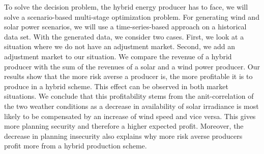 To solve the  decision problem, the hybrid energy producer has to face, we will solve a scenario-based multi-stage optimization problem. For generating wind and solar power scenarios, we will use a time-series-based approach on a historical data set. With the generated data, we consider two cases. First, we look at a situation where we do not have an adjustment market. Second, we add an adjustment market to our situation. We compare the revenue of a hybrid producer with the sum of the revenues of a solar and a wind power producer. Our results show that the more risk averse a producer is, the more profitable it is to produce in a hybrid scheme. This effect can be observed in both market situations. We conclude that this profitability stems from the anit-correlation of the two weather conditions as a decrease in availability of solar irradiance is most likely to be compensated by an increase of wind speed and vice versa. This gives more planning security and therefore a higher expected profit. Moreover, the decrease in planning insecurity also explains why more risk averse producers profit more from a hybrid production scheme.  
